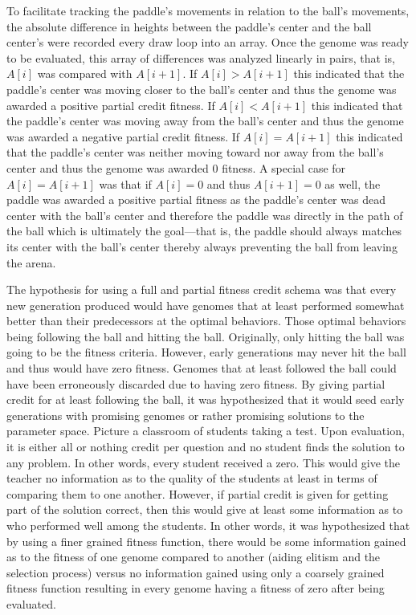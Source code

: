 \documentclass[a4paper,10pt]{article}
\begin{document}
To facilitate tracking the paddle's movements in relation to the ball's movements, the absolute difference in heights between the paddle's center and the ball center's were recorded every draw loop into an array. Once the genome was ready to be evaluated, this array of differences was analyzed linearly in pairs, that is, $A[i]$ was compared with $A[i+1]$. If $A[i]>A[i+1]$ this indicated that the paddle's center was moving closer to the ball's center and thus the genome was awarded a positive partial credit fitness. If $A[i]<A[i+1]$ this indicated that the paddle's center was moving away from the ball's center and thus the genome was awarded a negative partial credit fitness. If $A[i]=A[i+1]$ this indicated that the paddle's center was neither moving toward nor away from the ball's center and thus the genome was awarded $0$ fitness. A special case for $A[i]=A[i+1]$ was that if $A[i]=0$ and thus $A[i+1]=0$ as well, the paddle was awarded a positive partial fitness as the paddle's center was dead center with the ball's center and therefore the paddle was directly in the path of the ball which is ultimately the goal---that is, the paddle should always matches its center with the ball's center thereby always preventing the ball from leaving the arena.

The hypothesis for using a full and partial fitness credit schema was that every new generation produced would have genomes that at least performed somewhat better than their predecessors at the optimal behaviors. Those optimal behaviors being following the ball and hitting the ball. Originally, only hitting the ball was going to be the fitness criteria. However, early generations may never hit the ball and thus would have zero fitness. Genomes that at least followed the ball could have been erroneously discarded due to having zero fitness. By giving partial credit for at least following the ball, it was hypothesized that it would seed early generations with promising genomes or rather promising solutions to the parameter space. Picture a classroom of students taking a test. Upon evaluation, it is either all or nothing credit per question and no student finds the solution to any problem. In other words, every student received a zero. This would give the teacher no information as to the quality of the students at least in terms of comparing them to one another. However, if partial credit is given for getting part of the solution correct, then this would give at least some information as to who performed well among the students. In other words, it was hypothesized that by using a finer grained fitness function, there would be some information gained as to the fitness of one genome compared to another (aiding elitism and the selection process) versus no information gained using only a coarsely grained fitness function resulting in every genome having a fitness of zero after being evaluated.
\end{document}
